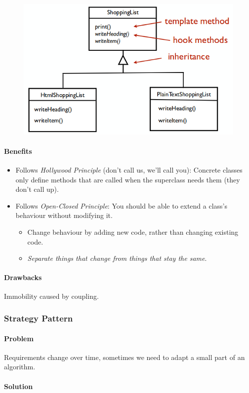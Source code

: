 \documentclass[twocolumn,english]{article}
\begin{document}
\begin{figure}[H]
\centering{}\includegraphics[width=0.5\columnwidth]{img/template-method}
\end{figure}

\paragraph{Benefits}
\begin{itemize}
\item Follows \emph{Hollywood Principle }(don't call us, we'll call you):
Concrete classes only define methods that are called when the superclass
needs them (they don't call up).
\item Follows \emph{Open-Closed Principle}: You should be able to extend
a class's behaviour without modifying it.
\begin{itemize}
\item Change behaviour by adding new code, rather than changing existing
code.
\item \emph{Separate things that change from things that stay the same}.
\end{itemize}
\end{itemize}

\paragraph{Drawbacks}

Immobility caused by coupling.

\subsubsection{Strategy Pattern}

\paragraph{Problem}

Requirements change over time, sometimes we need to adapt a small
part of an algorithm.

\paragraph{Solution}
\end{document}
